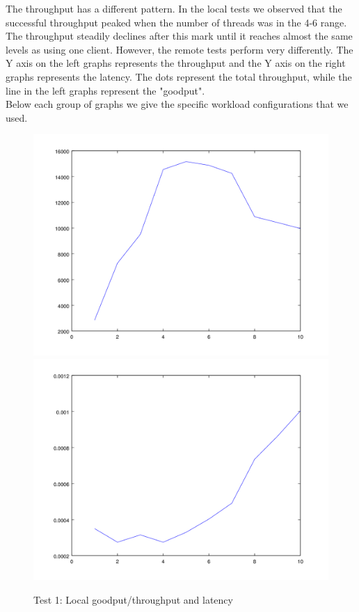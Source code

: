 \documentclass{article}      %
\begin{document}
The throughput has a different pattern. In the local tests we observed that the successful throughput peaked when the number of threads was in the 4-6 range. The throughput steadily declines after this mark until it reaches almost the same levels as using one client. However, the remote tests perform very differently. The Y axis on the left graphs represents the throughput and the Y axis on the right graphs represents the latency. The dots represent the total throughput, while the line in the left graphs represent the "goodput". \\

Below each group of graphs we give the specific workload configurations that we used.\\

\begin{figure}[ht]
\centering
 \includegraphics[scale=.33]{graphs/graph1-goodput}
 \includegraphics[scale=.33]{graphs/graph1-latency}
\caption{Test 1: Local goodput/throughput and latency \label{overflow}}
\end{figure}
\end{document}
